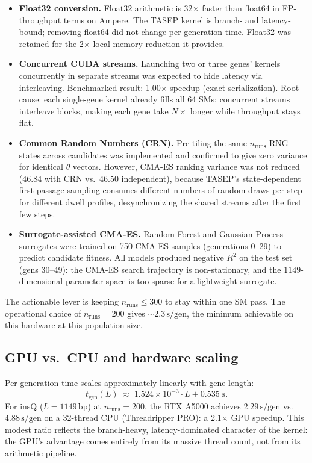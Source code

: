 \documentclass[11pt]{article}
\begin{document}
\begin{itemize}
  \item \textbf{Float32 conversion.} Float32 arithmetic is 32$\times$ faster
    than float64 in FP-throughput terms on Ampere. The TASEP kernel is branch-
    and latency-bound; removing float64 did not change per-generation time.
    Float32 was retained for the 2$\times$ local-memory reduction it provides.

  \item \textbf{Concurrent CUDA streams.} Launching two or three genes'
    kernels concurrently in separate streams was expected to hide latency via
    interleaving. Benchmarked result: 1.00$\times$ speedup (exact serialization).
    Root cause: each single-gene kernel already fills all 64 SMs; concurrent
    streams interleave blocks, making each gene take $N\times$ longer while
    throughput stays flat.

  \item \textbf{Common Random Numbers (CRN).} Pre-tiling the same $n_{\text{runs}}$
    RNG states across candidates was implemented and confirmed to give zero
    variance for identical $\theta$ vectors. However, CMA-ES ranking variance
    was not reduced (46.84 with CRN vs.\ 46.50 independent), because TASEP's
    state-dependent first-passage sampling consumes different numbers of random
    draws per step for different dwell profiles, desynchronizing the shared
    streams after the first few steps.

  \item \textbf{Surrogate-assisted CMA-ES.} Random Forest and Gaussian Process
    surrogates were trained on 750 CMA-ES samples (generations 0--29) to
    predict candidate fitness. All models produced negative $R^2$ on the
    test set (gens 30--49): the CMA-ES search trajectory is non-stationary, and
    the $1149$-dimensional parameter space is too sparse for a lightweight
    surrogate.
\end{itemize}

The actionable lever is keeping $n_{\text{runs}} \le 300$ to stay within one
SM pass. The operational choice of $n_{\text{runs}} = 200$ gives
$\sim 2.3\,\text{s/gen}$, the minimum achievable on this hardware at this
population size.

\subsection{GPU vs.\ CPU and hardware scaling}

Per-generation time scales approximately linearly with gene length:
\begin{equation}
  t_{\text{gen}}(L) \;\approx\; 1.524 \times 10^{-3} \cdot L + 0.535 \;\text{s}.
\end{equation}
For insQ ($L = 1149\,\text{bp}$) at $n_{\text{runs}} = 200$, the RTX A5000
achieves $2.29\,\text{s/gen}$ vs.\ $4.88\,\text{s/gen}$ on a 32-thread CPU
(Threadripper PRO): a 2.1$\times$ GPU speedup. This modest ratio reflects the
branch-heavy, latency-dominated character of the kernel: the GPU's advantage
comes entirely from its massive thread count, not from its arithmetic pipeline.
\end{document}
